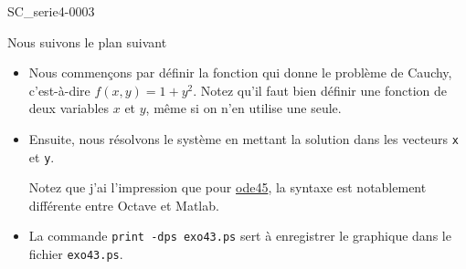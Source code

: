 \begin{corrige}{SC_serie4-0003}

Nous suivons le plan suivant
\begin{itemize}
	\item 
		Nous commençons par définir la fonction qui donne le problème de Cauchy, c'est-à-dire $f(x,y)=1+y^2$. Notez qu'il faut bien définir une fonction de deux variables $x$ et $y$, même si on n'en utilise une seule.

	\item
		Ensuite, nous résolvons le système en mettant la solution dans les vecteurs \verb+x+ et \verb+y+. 
		
		Notez que j'ai l'impression que pour \href{http://octave.sourceforge.net/doc/f/ode45.html}{ode45}, la syntaxe est notablement différente entre Octave et Matlab.

	\item
		La commande \verb+print -dps exo43.ps+ sert à enregistrer le graphique dans le fichier \verb+exo43.ps+.
\end{itemize}



\end{corrige}
